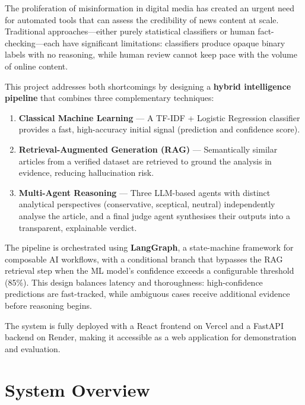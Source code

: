 \documentclass[12pt, a4paper]{article}
\begin{document}
The proliferation of misinformation in digital media has created an urgent
need for automated tools that can assess the credibility of news content at
scale. Traditional approaches---either purely statistical classifiers or
human fact-checking---each have significant limitations: classifiers produce
opaque binary labels with no reasoning, while human review cannot keep pace
with the volume of online content.

This project addresses both shortcomings by designing a \textbf{hybrid
intelligence pipeline} that combines three complementary techniques:

\begin{enumerate}[leftmargin=2em]
    \item \textbf{Classical Machine Learning} --- A TF-IDF + Logistic
          Regression classifier provides a fast, high-accuracy initial
          signal (prediction and confidence score).
    \item \textbf{Retrieval-Augmented Generation (RAG)} --- Semantically
          similar articles from a verified dataset are retrieved to ground
          the analysis in evidence, reducing hallucination risk.
    \item \textbf{Multi-Agent Reasoning} --- Three LLM-based agents with
          distinct analytical perspectives (conservative, sceptical, neutral)
          independently analyse the article, and a final judge agent
          synthesises their outputs into a transparent, explainable verdict.
\end{enumerate}

The pipeline is orchestrated using \textbf{LangGraph}, a state-machine
framework for composable AI workflows, with a conditional branch that
bypasses the RAG retrieval step when the ML model's confidence exceeds a
configurable threshold (85\%). This design balances latency and
thoroughness: high-confidence predictions are fast-tracked, while
ambiguous cases receive additional evidence before reasoning begins.

The system is fully deployed with a React frontend on Vercel and a FastAPI
backend on Render, making it accessible as a web application for
demonstration and evaluation.


\section{System Overview}
\end{document}
